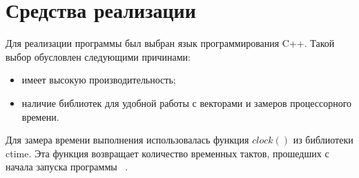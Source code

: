 \documentclass[12pt]{report}
\begin{document}
	\section{Средства реализации}
	Для реализации программы был выбран язык программирования C++. Такой выбор обусловлен следующими причинами:
	\begin{itemize}
		\item имеет высокую производительность;
		\item наличие библиотек для удобной работы с векторами и замеров процессорного времени.
	\end{itemize}
	
	Для замера времени выполнения использовалась функция $clock()$ из библиотеки ctime. Эта функция возвращает количество временных тактов, прошедших с начала запуска программы ~\cite{cpp}. 
	
\end{document}

